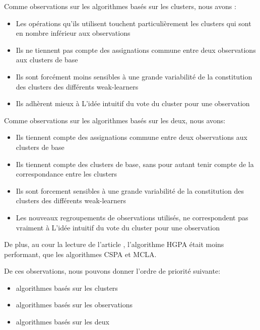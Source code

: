 \documentclass[12pt, french, latin.medieval, a4paper]{report}
\begin{document}
    Comme observations sur les algorithmes basés sur les clusters, nous avons :
    \begin{itemize}
        \item Les opérations qu'ils utilisent touchent particulièrement les clusters qui sont en nombre inférieur aux observations
        \item Ils ne tiennent pas compte des assignations commune entre deux observations aux clusters de base
        \item Ils sont forcément moins sensibles à une grande variabilité de la constitution des clusters des différents weak-learners
        \item Ils adhèrent mieux à L'idée intuitif du vote du cluster pour une observation
    \end{itemize}

    Comme observations sur les algorithmes basés sur les deux, nous avons:
    \begin{itemize}
        \item Ils tiennent compte des assignations commune entre deux observations aux clusters de base
        \item Ils tiennent compte des clusters de base, sans pour autant tenir compte de la correspondance entre les clusters
        \item Ils sont forcement sensibles à une grande variabilité de la constitution des clusters des différents weak-learners
        \item Les nouveaux regroupements de observations utilisés, ne correspondent pas vraiment à L'idée intuitif du vote du cluster pour une observation
    \end{itemize}

    De plus, au cour la lecture de l'article \cite{strehl2002cluster}, l'algorithme HGPA était moins performant, que les algorithmes CSPA et MCLA.

    De ces observations, nous pouvons donner l'ordre de priorité suivante:
    \begin{itemize}
        \item algorithmes basés sur les clusters
        \item algorithmes basés sur les observations
        \item algorithmes basés sur les deux
    \end{itemize}


    
\end{document}
